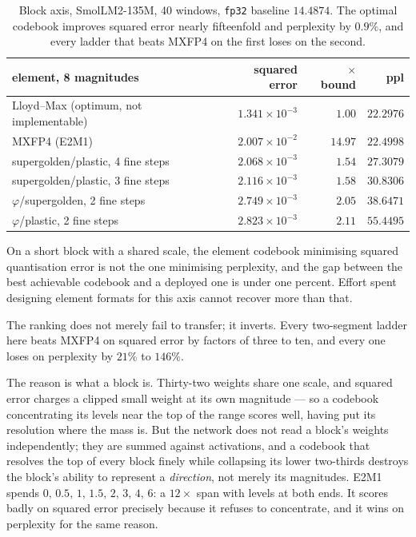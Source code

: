 \begin{table}[t]\centering
\caption{Block axis, SmolLM2-135M, 40 windows, \texttt{fp32} baseline $14.4874$.
The optimal codebook improves squared error nearly fifteenfold and perplexity by
$0.9\%$, and every ladder that beats MXFP4 on the first loses on the second.}
\label{tab:blockbound}
\begin{tabular}{lrrr}
\toprule
element, 8 magnitudes & squared error & $\times$ bound & ppl \\
\midrule
Lloyd--Max (optimum, not implementable) & $1.341\!\times\!10^{-3}$ & $1.00$ & $\mathbf{22.2976}$ \\
MXFP4 (E2M1)                            & $2.007\!\times\!10^{-2}$ & $14.97$ & $\mathbf{22.4998}$ \\
supergolden/plastic, 4 fine steps       & $2.068\!\times\!10^{-3}$ & $1.54$ & $27.3079$ \\
supergolden/plastic, 3 fine steps       & $2.116\!\times\!10^{-3}$ & $1.58$ & $30.8306$ \\
$\varphi$/supergolden, 2 fine steps     & $2.749\!\times\!10^{-3}$ & $2.05$ & $38.6471$ \\
$\varphi$/plastic, 2 fine steps         & $2.823\!\times\!10^{-3}$ & $2.11$ & $55.4495$ \\
\bottomrule
\end{tabular}
\end{table}

\begin{theorem}\label{thm:block}
On a short block with a shared scale, the element codebook minimising squared
quantisation error is not the one minimising perplexity, and the gap between the
best achievable codebook and a deployed one is under one percent. Effort spent
designing element formats for this axis cannot recover more than that.
\end{theorem}

The ranking does not merely fail to transfer; it inverts. Every two-segment
ladder here beats MXFP4 on squared error by factors of three to ten, and every
one loses on perplexity by $21\%$ to $146\%$.

The reason is what a block is. Thirty-two weights share one scale, and squared
error charges a clipped small weight at its own magnitude --- so a codebook
concentrating its levels near the top of the range scores well, having put its
resolution where the mass is. But the network does not read a block's weights
independently; they are summed against activations, and a codebook that
resolves the top of every block finely while collapsing its lower two-thirds
destroys the block's ability to represent a \emph{direction}, not merely its
magnitudes. E2M1 spends $0,\,0.5,\,1,\,1.5,\,2,\,3,\,4,\,6$: a $12\times$ span
with levels at both ends. It scores badly on squared error precisely because it
refuses to concentrate, and it wins on perplexity for the same reason.

